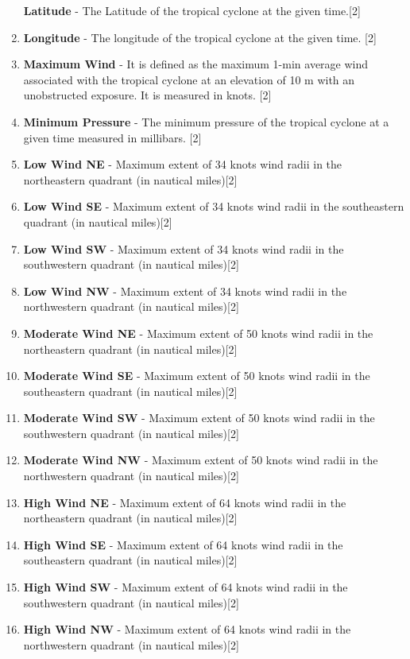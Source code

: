 \documentclass[11pt]{article}
\begin{document}
\begin{enumerate}
  \textbf{Latitude} - The Latitude of the tropical cyclone at the given
  time.{[}2{]}
\item
  \textbf{Longitude} - The longitude of the tropical cyclone at the
  given time. {[}2{]}
\item
  \textbf{Maximum Wind} - It is defined as the maximum 1-min average
  wind associated with the tropical cyclone at an elevation of 10 m with
  an unobstructed exposure. It is measured in knots. {[}2{]}
\item
  \textbf{Minimum Pressure} - The minimum pressure of the tropical
  cyclone at a given time measured in millibars. {[}2{]}
\item
  \textbf{Low Wind NE} - Maximum extent of 34 knots wind radii in the
  northeastern quadrant (in nautical miles){[}2{]}
\item
  \textbf{Low Wind SE} - Maximum extent of 34 knots wind radii in the
  southeastern quadrant (in nautical miles){[}2{]}
\item
  \textbf{Low Wind SW} - Maximum extent of 34 knots wind radii in the
  southwestern quadrant (in nautical miles){[}2{]}
\item
  \textbf{Low Wind NW} - Maximum extent of 34 knots wind radii in the
  northwestern quadrant (in nautical miles){[}2{]}
\item
  \textbf{Moderate Wind NE} - Maximum extent of 50 knots wind radii in
  the northeastern quadrant (in nautical miles){[}2{]}
\item
  \textbf{Moderate Wind SE} - Maximum extent of 50 knots wind radii in
  the southeastern quadrant (in nautical miles){[}2{]}
\item
  \textbf{Moderate Wind SW} - Maximum extent of 50 knots wind radii in
  the southwestern quadrant (in nautical miles){[}2{]}
\item
  \textbf{Moderate Wind NW} - Maximum extent of 50 knots wind radii in
  the northwestern quadrant (in nautical miles){[}2{]}
\item
  \textbf{High Wind NE} - Maximum extent of 64 knots wind radii in the
  northeastern quadrant (in nautical miles){[}2{]}
\item
  \textbf{High Wind SE} - Maximum extent of 64 knots wind radii in the
  southeastern quadrant (in nautical miles){[}2{]}
\item
  \textbf{High Wind SW} - Maximum extent of 64 knots wind radii in the
  southwestern quadrant (in nautical miles){[}2{]}
\item
  \textbf{High Wind NW} - Maximum extent of 64 knots wind radii in the
  northwestern quadrant (in nautical miles){[}2{]}
\end{enumerate}
\end{document}
